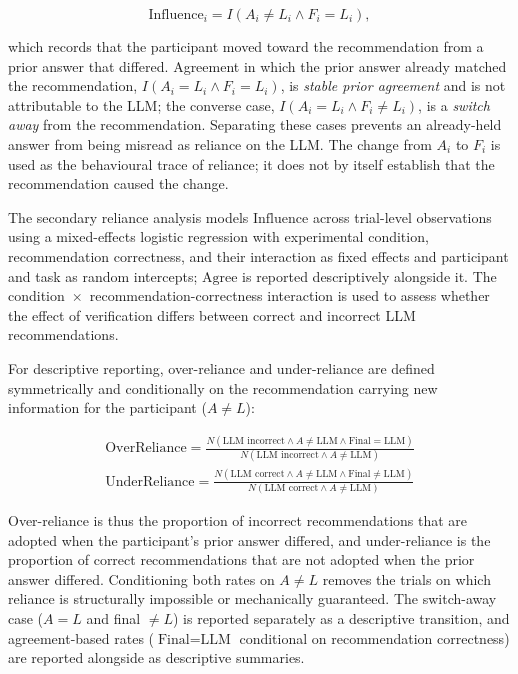 \documentclass[oneside,final,14pt,a4paper]{extreport}
\begin{document}
$$
\text{Influence}_i = I(A_i \neq L_i \land F_i = L_i),
$$

which records that the participant moved toward the recommendation from a
prior answer that differed. Agreement in which the prior answer already matched
the recommendation, $I(A_i = L_i \land F_i = L_i)$, is \emph{stable prior
agreement} and is not attributable to the LLM; the converse case, $I(A_i = L_i
\land F_i \neq L_i)$, is a \emph{switch away} from the recommendation.
Separating these cases prevents an already-held answer from being misread as
reliance on the LLM. The change from $A_i$ to $F_i$ is used as the behavioural
trace of reliance; it does not by itself establish that the recommendation
caused the change.

The secondary reliance analysis models $\text{Influence}$ across trial-level
observations using a mixed-effects logistic regression with experimental
condition, recommendation correctness, and their interaction as fixed effects
and participant and task as random intercepts; $\text{Agree}$ is reported
descriptively alongside it. The condition~$\times$~recommendation-correctness
interaction is used to assess whether the effect of verification differs
between correct and incorrect LLM recommendations.

For descriptive reporting, over-reliance and under-reliance are defined
symmetrically and conditionally on the recommendation carrying new information
for the participant ($A\neq L$):

$$
\begin{array}{c}
\displaystyle
\text{OverReliance}
=
\frac{
N(\text{LLM incorrect}\land A\neq\text{LLM}\land\text{Final}=\text{LLM})
}{
N(\text{LLM incorrect}\land A\neq\text{LLM})
}
\\[1.5em]
\displaystyle
\text{UnderReliance}
=
\frac{
N(\text{LLM correct}\land A\neq\text{LLM}\land\text{Final}\neq\text{LLM})
}{
N(\text{LLM correct}\land A\neq\text{LLM})
}
\end{array}
$$

Over-reliance is thus the proportion of incorrect recommendations that are
adopted when the participant's prior answer differed, and under-reliance is the
proportion of correct recommendations that are not adopted when the prior
answer differed. Conditioning both rates on $A\neq L$ removes the trials on
which reliance is structurally impossible or mechanically guaranteed. The
switch-away case ($A=L$ and final $\neq L$) is reported separately as a
descriptive transition, and agreement-based rates
($\text{Final}=\text{LLM}$ conditional on recommendation correctness) are
reported alongside as descriptive summaries.
\end{document}
